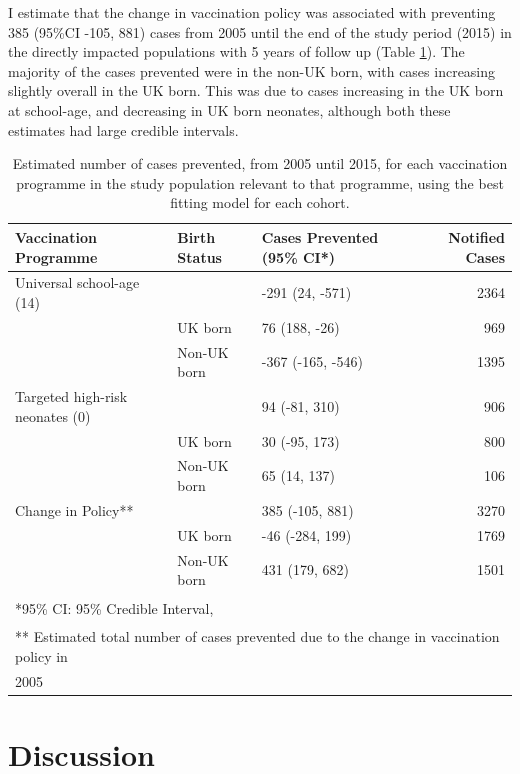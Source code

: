 \documentclass[11pt,twoside]{bristolthesis}
\begin{document}
  I estimate that the change in vaccination policy was associated with preventing 385 (95\%CI -105, 881) cases from 2005 until the end of the study period (2015) in the directly impacted populations with 5 years of follow up (Table \ref{tab:07-tab-impact}). The majority of the cases prevented were in the non-UK born, with cases increasing slightly overall in the UK born. This was due to cases increasing in the UK born at school-age, and decreasing in UK born neonates, although both these estimates had large credible intervals.
  \begin{table}[!h]
  
  \caption{\label{tab:07-tab-impact}Estimated number of cases prevented, from 2005 until 2015, for each vaccination programme in the study population relevant to that programme, using the best fitting model for each cohort.}
  \centering
  \begin{tabular}{lllr}
  \toprule
  Vaccination Programme & Birth Status & Cases Prevented (95\% CI*) & Notified Cases\\
  \midrule
  Universal school-age (14) &  & -291 (24, -571) & 2364\\
   & UK born & 76 (188, -26) & 969\\
   & Non-UK born & -367 (-165, -546) & 1395\\
  Targeted high-risk neonates (0) &  & 94 (-81, 310) & 906\\
   & UK born & 30 (-95, 173) & 800\\
  \addlinespace
   & Non-UK born & 65 (14, 137) & 106\\
  Change in Policy** &  & 385 (-105, 881) & 3270\\
   & UK born & -46 (-284, 199) & 1769\\
   & Non-UK born & 431 (179, 682) & 1501\\
  \bottomrule
  \multicolumn{4}{l}{\textsuperscript{} *95\% CI: 95\% Credible Interval,}\\
  \multicolumn{4}{l}{\textsuperscript{} ** Estimated total number of cases prevented due to the change in vaccination policy in}\\
  \multicolumn{4}{l}{2005}\\
  \end{tabular}
  \end{table}
  \hypertarget{discussion-4}{%
  \section{Discussion}\label{discussion-4}}
  
\end{document}
